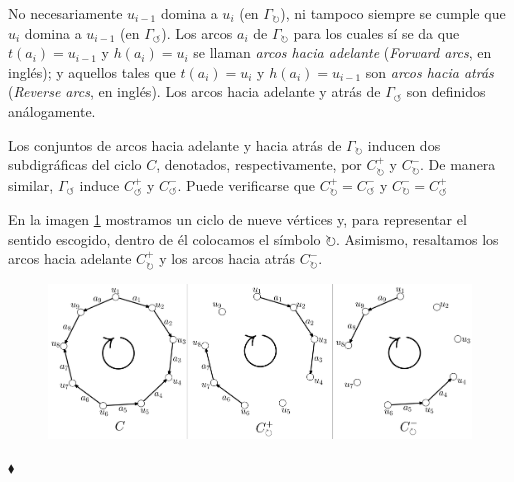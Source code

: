   No necesariamente $u_{i-1}$ domina a $u_{i}$ (en $\Gamma_{\mathbf{\circlearrowright}}$), ni tampoco siempre se cumple que  $u_{i}$ domina a $u_{i-1}$ (en $\Gamma_{\mathbf{\circlearrowleft}}$). Los arcos $a_{i}$ de $\Gamma_{\mathbf{\circlearrowright}}$ para los cuales sí se da que $t(a_{i}) = u_{i-1}$ y $h(a_{i})=u_{i}$ se llaman \textit{arcos hacia adelante} (\textit{Forward arcs}, en inglés); y aquellos tales que $t(a_{i})=u_{i}$ y $h(a_{i})=u_{i-1}$ son \textit{arcos hacia atrás} (\textit{Reverse arcs}, en inglés). Los arcos hacia adelante y atrás de $\Gamma_{\mathbf{\circlearrowleft}}$ son definidos análogamente.

Los conjuntos de arcos hacia adelante y hacia atrás de $\Gamma_{\mathbf{\circlearrowright}}$ inducen dos subdigráficas del ciclo $C$, denotados, respectivamente, por $C^{+}_{\mathbf{\circlearrowright}}$ y $C^{-}_{\mathbf{\circlearrowright}}$. De manera similar, $\Gamma_{\mathbf{\circlearrowleft}}$ induce $C^{+}_{\mathbf{\circlearrowleft}}$ y $C^{-}_{\mathbf{\circlearrowleft}}$. Puede verificarse que $C^{+}_{\mathbf{\circlearrowright}}=C^{-}_{\mathbf{\circlearrowleft}}$ y $C^{-}_{\mathbf{\circlearrowright}} = C^{+}_{\mathbf{\circlearrowleft}} $

\begin{ejem}
En la imagen \ref{fig:ciclosentidos} mostramos un ciclo de nueve vértices y, para representar el sentido escogido, dentro de él colocamos el símbolo $\mathbf{\circlearrowright}$. Asimismo, resaltamos los arcos hacia adelante $C^{+}_{\mathbf{\circlearrowright}}$ y los arcos hacia atrás $C^{-}_{\mathbf{\circlearrowright}}$. 

\begin{figure}[H]
    \centering
    \includegraphics[scale=0.15]{img/imgchapter1/sentidociclos.jpg}
    \caption{}
    \label{fig:ciclosentidos}
\end{figure}

\hfill $\blacklozenge$
\end{ejem}

